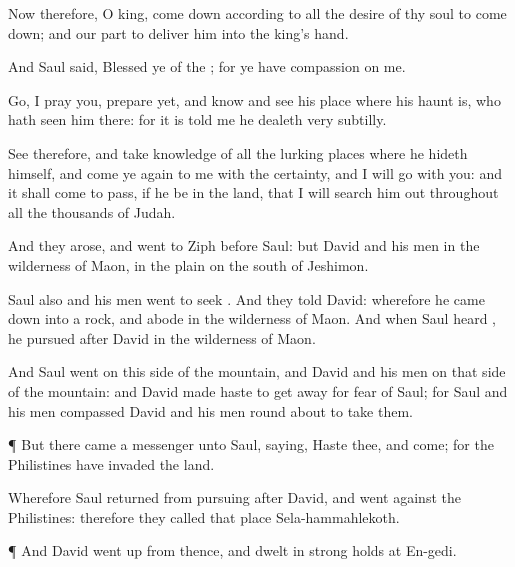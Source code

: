{Now therefore, O
king, come
down according to all the
desire of thy
soul to come
down; and our part
{} to
deliver him into the
king’s
hand.

And
Saul
said,
Blessed
{} ye of the
{}; for ye have
compassion on me.

Go, I pray you,
prepare yet, and
know and
see his
place where his
haunt is,
{} who hath
seen him there: for it is
told me
{} he dealeth
very
subtilly.

See therefore, and take
knowledge of all the lurking
places where he
hideth himself, and come ye
again to me with the
certainty, and I will
go with you: and it shall come to pass, if he
be in the
land, that I will
search him out throughout all the
thousands of
Judah.

And they
arose, and
went to
Ziph
before
Saul: but
David and his
men
{} in the
wilderness of
Maon, in the
plain on the
south of
Jeshimon.

Saul also and his
men
went to
seek
{}. And they
told
David: wherefore he came
down into a
rock, and
abode in the
wilderness of
Maon. And when
Saul
heard
{}, he
pursued
after
David in the
wilderness of
Maon.

And
Saul
went on this
side of the
mountain, and
David and his
men on that
side of the
mountain: and
David made
haste to get
away for
fear of
Saul; for
Saul and his
men
compassed
David and his
men round
about to
take them.


\par }{\PP {}¶ But there
came a
messenger unto
Saul,
saying,
Haste thee, and
come; for the
Philistines have
invaded the
land.

Wherefore
Saul
returned from
pursuing
after
David, and
went
against the
Philistines: therefore they
called that
place
Sela-hammahlekoth.


\par }{\PP {}¶ And
David went
up from thence, and
dwelt in strong
holds at
En-gedi.




\par }
